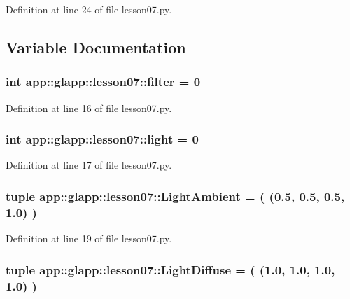Definition at line 24 of file lesson07.py.

\subsection{Variable Documentation}
\subsubsection{\setlength{\rightskip}{0pt plus 5cm}int {\bf app::glapp::lesson07::filter} = 0\hspace{0.3cm}{\tt  [static]}}\label{namespaceapp_1_1glapp_1_1lesson07_3a48729d62935386f3d9d94a29e06e2a}




Definition at line 16 of file lesson07.py.
\subsubsection{\setlength{\rightskip}{0pt plus 5cm}int {\bf app::glapp::lesson07::light} = 0\hspace{0.3cm}{\tt  [static]}}\label{namespaceapp_1_1glapp_1_1lesson07_6703a49e52ec5f5c4bbbe577ed07f99b}




Definition at line 17 of file lesson07.py.
\subsubsection{\setlength{\rightskip}{0pt plus 5cm}tuple {\bf app::glapp::lesson07::LightAmbient} = ( (0.5, 0.5, 0.5, 1.0) )\hspace{0.3cm}{\tt  [static]}}\label{namespaceapp_1_1glapp_1_1lesson07_78680a86efd36fa884c40683ac4f9ae0}




Definition at line 19 of file lesson07.py.
\subsubsection{\setlength{\rightskip}{0pt plus 5cm}tuple {\bf app::glapp::lesson07::LightDiffuse} = ( (1.0, 1.0, 1.0, 1.0) )\hspace{0.3cm}{\tt  [static]}}\label{namespaceapp_1_1glapp_1_1lesson07_d49898cb2903a907aa9ed9f4aba2e564}




